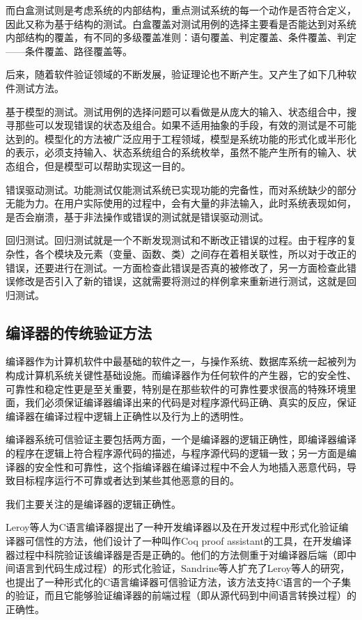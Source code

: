 而白盒测试则是考虑系统的内部结构，重点测试系统的每一个动作是否符合定义，因此又称为基于结构的测试。白盒覆盖对测试用例的选择主要看是否能达到对系统内部结构的覆盖，有不同的多级覆盖准则：语句覆盖、判定覆盖、条件覆盖、判定——条件覆盖、路径覆盖等。

后来，随着软件验证领域的不断发展，验证理论也不断产生。又产生了如下几种软件测试方法。

基于模型的测试。测试用例的选择问题可以看做是从庞大的输入、状态组合中，搜寻那些可以发现错误的状态及组合。如果不适用抽象的手段，有效的测试是不可能达到的。模型化的方法被广泛应用于工程领域，模型是系统功能的形式化或半形化的表示，必须支持输入、状态系统组合的系统枚举，虽然不能产生所有的输入、状态组合，但是模型可以帮助实现这一目的。

错误驱动测试。功能测试仅能测试系统已实现功能的完备性，而对系统缺少的部分无能为力。在用户实际使用的过程中，会有大量的非法输入，此时系统表现如何，是否会崩溃，基于非法操作或错误的测试就是错误驱动测试。

回归测试。回归测试就是一个不断发现测试和不断改正错误的过程。由于程序的复杂性，各个模块及元素（变量、函数、类）之间存在着相关联性，所以对于改正的错误，还要进行在测试。一方面检查此错误是否真的被修改了，另一方面检查此错误修改是否引入了新的错误，这就需要将测过的样例拿来重新进行测试，这就是回归测试。

\subsection{编译器的传统验证方法}
编译器作为计算机软件中最基础的软件之一，与操作系统、数据库系统一起被列为构成计算机系统关键性基础设施。而编译器作为任何软件的产生器，它的安全性、可靠性和稳定性更是至关重要，特别是在那些软件的可靠性要求很高的特殊环境里面，我们必须保证编译器编译出来的代码是对程序源代码正确、真实的反应，保证编译器在编译过程中逻辑上正确性以及行为上的透明性。

编译器系统可信验证主要包括两方面，一个是编译器的逻辑正确性，即编译器编译的程序在逻辑上符合程序源代码的描述，与程序源代码的逻辑一致；另一方面是编译器的安全性和可靠性，这个指编译器在编译过程中不会人为地插入恶意代码，导致目标程序运行不可靠或者达到某些其他恶意的目的。

我们主要关注的是编译器的逻辑正确性。

Leroy等人为C语言编译器提出了一种开发编译器以及在开发过程中形式化验证编译器可信性的方法，他们设计了一种叫作Coq proof assistant的工具，在开发编译器过程中科院验证该编译器是否是正确的。他们的方法侧重于对编译器后端（即中间语言到代码生成过程）的形式化验证，Sandrine等人扩充了Leroy等人的研究，也提出了一种形式化的C语言编译器可信验证方法，该方法支持C语言的一个子集的验证，而且它能够验证编译器的前端过程（即从源代码到中间语言转换过程）的正确性。

